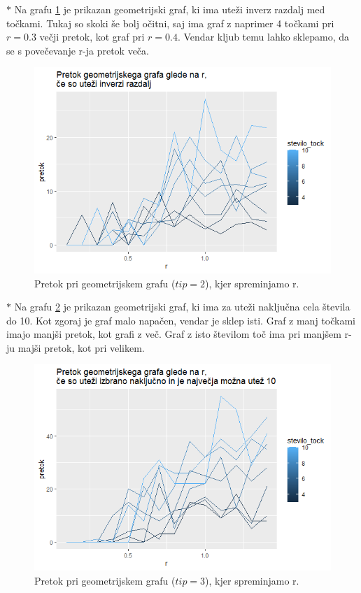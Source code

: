 \documentclass[a4paper]{article}
\begin{document}
$\ast$ Na grafu \ref{fig15} je prikazan geometrijski graf, ki ima uteži inverz razdalj med točkami. Tukaj so skoki še bolj očitni, saj ima graf z naprimer 4 točkami pri $r = 0.3$ večji pretok, kot graf pri $r = 0.4.$ Vendar kljub temu lahko sklepamo, da se s povečevanje r-ja pretok veča. 
\begin{figure}[H]
\centerline{\includegraphics[scale=.6]{p11.PNG}}
\caption{Pretok pri geometrijskem grafu ($tip = 2$), kjer spreminjamo r.}
\label{fig15}
\end{figure} 


$\ast$  Na grafu \ref{fig16} je prikazan geometrijski graf, ki ima za uteži naključna cela števila do 10. Kot zgoraj je graf malo napačen, vendar je sklep isti. Graf z manj točkami imajo manjši pretok, kot grafi z več. Graf z isto številom toč ima pri manjšem r-ju majši pretok, kot pri velikem. 
\begin{figure}[H]
\centerline{\includegraphics[scale=.6]{p12.PNG}}
\caption{Pretok pri geometrijskem grafu ($tip = 3$),  kjer spreminjamo r.}
\label{fig16}
\end{figure} 
\end{document}

